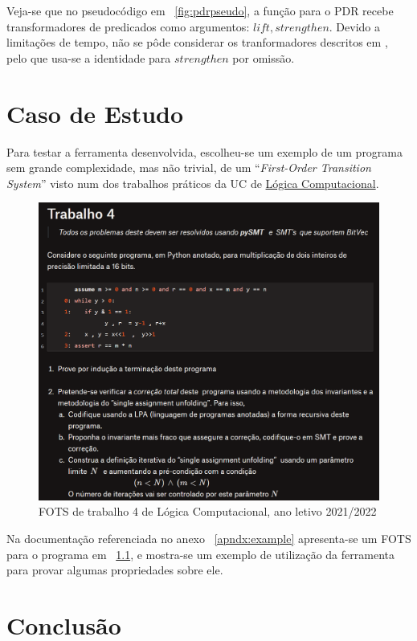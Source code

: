 \documentclass[11pt,a4paper]{report}%
\def\fots{``\textit{First-Order Transition System}''\xspace}
\def\lc{Lógica Computacional\xspace}
\begin{document}
Veja-se que no pseudocódigo em ~\ref{fig:pdrpseudo}, a função para o PDR recebe
transformadores de predicados como argumentos: $lift, strengthen$.
Devido a limitações de tempo, não se pôde considerar os tranformadores descritos
em \cite{pdr_state_of_art}, pelo que usa-se a identidade para $strengthen$ por omissão.

\chapter{Caso de Estudo}\label{chap:case_study}

Para testar a ferramenta desenvolvida, escolheu-se um exemplo de um programa sem
grande complexidade, mas não trivial, de um \fots visto num dos trabalhos práticos da UC de 
\href{https://paper.dropbox.com/doc/LC-2021-2022-Trabalhos-Praticos-NZEwyS6N5YQQTw1XsYimE#:uid=036036509450795602269559&h2=Trabalho-4}{\lc}.

\begin{figure}[H]
      \centering
      \includegraphics[scale=0.68]{lc-trab4.png}
      \caption{FOTS de trabalho 4 de \lc, ano letivo 2021/2022}
      \label{fig:trab4}
\end{figure}

Na documentação referenciada no anexo ~\ref{apndx:example} apresenta-se um FOTS para o programa em
~\ref{fig:trab4}, e mostra-se um exemplo de utilização da ferramenta para provar algumas propriedades
sobre ele.

\chapter{Conclusão} \label{chap:concl}
\end{document}
